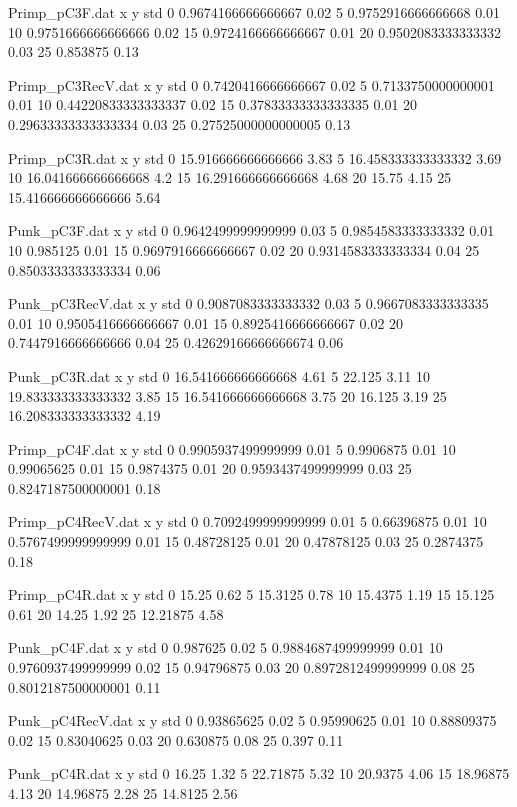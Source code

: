 \begin{filecontents}{Primp_pC3F.dat}
x y std
0 0.9674166666666667 0.02
5 0.9752916666666668 0.01
10 0.9751666666666666 0.02
15 0.9724166666666667 0.01
20 0.9502083333333332 0.03
25 0.853875 0.13
\end{filecontents}
\begin{filecontents}{Primp_pC3RecV.dat}
x y std
0 0.7420416666666667 0.02
5 0.7133750000000001 0.01
10 0.44220833333333337 0.02
15 0.37833333333333335 0.01
20 0.29633333333333334 0.03
25 0.27525000000000005 0.13
\end{filecontents}
\begin{filecontents}{Primp_pC3R.dat}
x y std
0 15.916666666666666 3.83
5 16.458333333333332 3.69
10 16.041666666666668 4.2
15 16.291666666666668 4.68
20 15.75 4.15
25 15.416666666666666 5.64
\end{filecontents}
\begin{filecontents}{Punk_pC3F.dat}
x y std
0 0.9642499999999999 0.03
5 0.9854583333333332 0.01
10 0.985125 0.01
15 0.9697916666666667 0.02
20 0.9314583333333334 0.04
25 0.8503333333333334 0.06
\end{filecontents}
\begin{filecontents}{Punk_pC3RecV.dat}
x y std
0 0.9087083333333332 0.03
5 0.9667083333333335 0.01
10 0.9505416666666667 0.01
15 0.8925416666666667 0.02
20 0.7447916666666666 0.04
25 0.42629166666666674 0.06
\end{filecontents}
\begin{filecontents}{Punk_pC3R.dat}
x y std
0 16.541666666666668 4.61
5 22.125 3.11
10 19.833333333333332 3.85
15 16.541666666666668 3.75
20 16.125 3.19
25 16.208333333333332 4.19
\end{filecontents}
\begin{filecontents}{Primp_pC4F.dat}
x y std
0 0.9905937499999999 0.01
5 0.9906875 0.01
10 0.99065625 0.01
15 0.9874375 0.01
20 0.9593437499999999 0.03
25 0.8247187500000001 0.18
\end{filecontents}
\begin{filecontents}{Primp_pC4RecV.dat}
x y std
0 0.7092499999999999 0.01
5 0.66396875 0.01
10 0.5767499999999999 0.01
15 0.48728125 0.01
20 0.47878125 0.03
25 0.2874375 0.18
\end{filecontents}
\begin{filecontents}{Primp_pC4R.dat}
x y std
0 15.25 0.62
5 15.3125 0.78
10 15.4375 1.19
15 15.125 0.61
20 14.25 1.92
25 12.21875 4.58
\end{filecontents}
\begin{filecontents}{Punk_pC4F.dat}
x y std
0 0.987625 0.02
5 0.9884687499999999 0.01
10 0.9760937499999999 0.02
15 0.94796875 0.03
20 0.8972812499999999 0.08
25 0.8012187500000001 0.11
\end{filecontents}
\begin{filecontents}{Punk_pC4RecV.dat}
x y std
0 0.93865625 0.02
5 0.95990625 0.01
10 0.88809375 0.02
15 0.83040625 0.03
20 0.630875 0.08
25 0.397 0.11
\end{filecontents}
\begin{filecontents}{Punk_pC4R.dat}
x y std
0 16.25 1.32
5 22.71875 5.32
10 20.9375 4.06
15 18.96875 4.13
20 14.96875 2.28
25 14.8125 2.56
\end{filecontents}